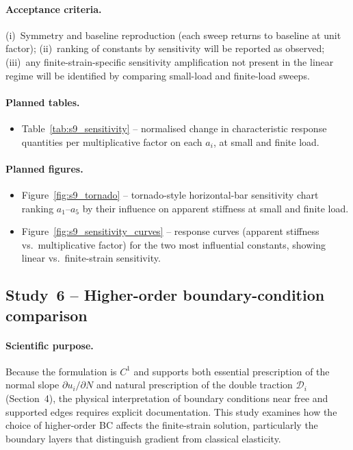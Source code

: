 \documentclass[11pt]{article}
\begin{document}
\paragraph{Acceptance criteria.}
(i)~Symmetry and baseline reproduction (each sweep returns to
baseline at unit factor); (ii)~ranking of constants by
sensitivity will be reported as observed; (iii)~any
finite-strain-specific sensitivity amplification not present
in the linear regime will be identified by comparing
small-load and finite-load sweeps.

\paragraph{Planned tables.}
\begin{itemize}
  \item Table~\ref{tab:s9_sensitivity} -- normalised change
    in characteristic response quantities per multiplicative
    factor on each $a_i$, at small and finite load.
\end{itemize}

\paragraph{Planned figures.}
\begin{itemize}
  \item Figure~\ref{fig:s9_tornado} -- tornado-style
    horizontal-bar sensitivity chart ranking $a_1$--$a_5$ by
    their influence on apparent stiffness at small and finite
    load.
  \item Figure~\ref{fig:s9_sensitivity_curves} -- response
    curves (apparent stiffness vs.\ multiplicative factor)
    for the two most influential constants, showing linear
    vs.\ finite-strain sensitivity.
\end{itemize}

\subsection{Study~6 -- Higher-order boundary-condition comparison}
\label{ssec:s9_study6}

\paragraph{Scientific purpose.}
Because the formulation is $C^1$ and supports both essential
prescription of the normal slope $\partial u_i/\partial N$ and
natural prescription of the double traction $\mathcal{D}_i$
(Section~4), the physical interpretation of boundary conditions
near free and supported edges requires explicit documentation.
This study examines how the choice of higher-order BC affects
the finite-strain solution, particularly the boundary layers
that distinguish gradient from classical elasticity.
\end{document}
